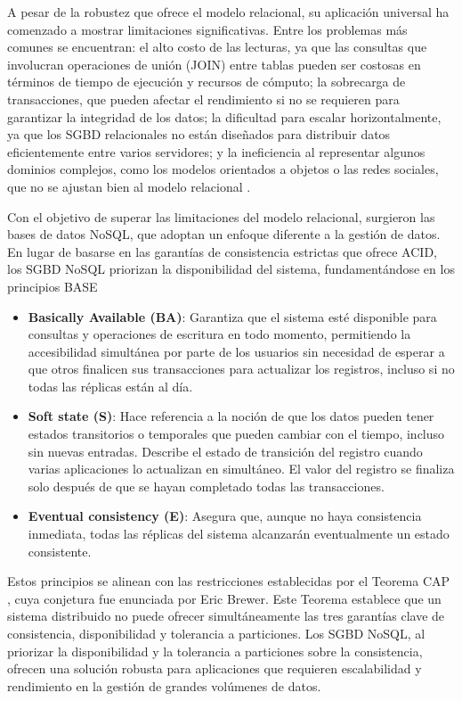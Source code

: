 A pesar de la robustez que ofrece el modelo relacional, su aplicación universal 
ha comenzado a mostrar limitaciones significativas. Entre los problemas más comunes 
se encuentran: el alto costo de las lecturas, ya que las consultas que involucran 
operaciones de unión (JOIN) entre tablas pueden ser costosas en términos de tiempo 
de ejecución y recursos de cómputo; la sobrecarga de transacciones, que pueden afectar 
el rendimiento si no se requieren para garantizar la integridad de los datos; 
la dificultad para escalar horizontalmente, ya que los SGBD relacionales no están 
diseñados para distribuir datos eficientemente entre varios servidores; y la ineficiencia 
al representar algunos dominios complejos, como los modelos orientados a objetos o 
las redes sociales, que no se ajustan bien al modelo relacional \cite{Camacho}.

Con el objetivo de superar las limitaciones del modelo relacional, surgieron 
las bases de datos NoSQL, que adoptan un enfoque diferente a la gestión de datos. 
En lugar de basarse en las garantías de consistencia estrictas que ofrece ACID, 
los SGBD NoSQL priorizan la disponibilidad del sistema, fundamentándose en los 
principios BASE \cite{AWS}

\begin{itemize}
    \item \textbf{Basically Available (BA)}: Garantiza que el sistema esté disponible 
    para consultas y operaciones de escritura en todo momento, permitiendo la accesibilidad 
    simultánea por parte de los usuarios sin necesidad de esperar a que otros finalicen 
    sus transacciones para actualizar los registros, incluso si no todas las réplicas 
    están al día.
    \item \textbf{Soft state (S)}: Hace referencia a la noción de que los datos pueden 
    tener estados transitorios o temporales que pueden cambiar con el tiempo, incluso 
    sin nuevas entradas. Describe el estado de transición del registro cuando varias 
    aplicaciones lo actualizan en simultáneo. El valor del registro se finaliza solo 
    después de que se hayan completado todas las transacciones. 
    \item \textbf{Eventual consistency (E)}: Asegura que, aunque no haya consistencia 
    inmediata, todas las réplicas del sistema alcanzarán eventualmente un estado consistente.
\end{itemize}

Estos principios se alinean con las restricciones establecidas por el Teorema CAP \cite{CAP}, 
cuya conjetura fue enunciada por Eric Brewer. Este Teorema establece que un sistema distribuido 
no puede ofrecer simultáneamente las tres garantías clave de consistencia, disponibilidad 
y tolerancia a particiones. Los SGBD NoSQL, al priorizar la disponibilidad y la tolerancia 
a particiones sobre la consistencia, ofrecen una solución robusta para aplicaciones que requieren 
escalabilidad y rendimiento en la gestión de grandes volúmenes de datos.

